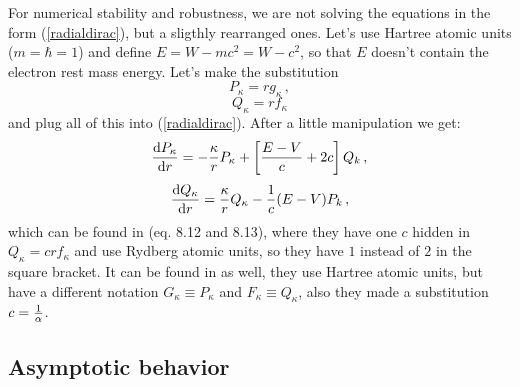 For numerical stability and robustness, we are not solving the equations in the form (\ref{radialdirac}), but a sligthly rearranged ones. Let's use Hartree atomic units ($m=\hbar=1$) and define $E=W-mc^2=W-c^2$, so that $E$ doesn't contain the electron rest mass energy. Let's make the substitution \cite{donald:apw} 
\begin{equation*}
  P_\kappa=rg_\kappa\,,
\end{equation*}
\begin{equation*}
  Q_\kappa=rf_\kappa
\end{equation*}
and plug all of this into (\ref{radialdirac}). After a little manipulation we get: 
\begin{equation*}
  {{\rm d}P_\kappa\over{\rm d}r}=-{\kappa\over r}P_\kappa+\left[{E-V\over c}+2c\right]Q_k\,,
\end{equation*}
\begin{equation}
  {{\rm d}Q_\kappa\over{\rm d}r}={\kappa\over r}Q_\kappa-{1\over c}(E-V)P_k\,,  \label{radialdirac2}
\end{equation}
which can be found in \cite{zabloudil} (eq. 8.12 and 8.13), where they have one $c$ hidden in $Q_\kappa=crf_\kappa$ and use Rydberg atomic units, so they have $1$ instead of $2$ in the square bracket. It can be found in \cite{bachelet} as well, they use Hartree atomic units, but have a different notation $G_\kappa\equiv P_\kappa$ and $F_\kappa\equiv Q_\kappa$, also they made a substitution $c={1\over\alpha}$.

\subsection{Asymptotic behavior}

